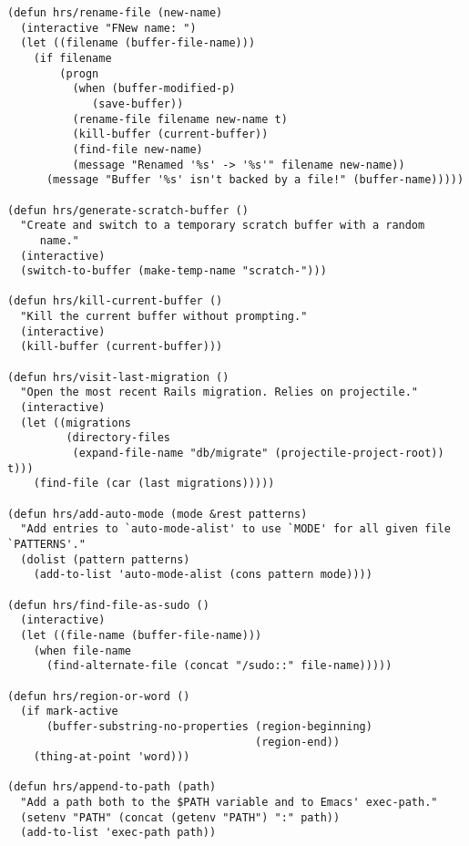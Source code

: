 \documentclass{article}
\begin{document}
\begin{verbatim}
(defun hrs/rename-file (new-name)
  (interactive "FNew name: ")
  (let ((filename (buffer-file-name)))
	(if filename
		(progn
		  (when (buffer-modified-p)
			 (save-buffer))
		  (rename-file filename new-name t)
		  (kill-buffer (current-buffer))
		  (find-file new-name)
		  (message "Renamed '%s' -> '%s'" filename new-name))
	  (message "Buffer '%s' isn't backed by a file!" (buffer-name)))))

(defun hrs/generate-scratch-buffer ()
  "Create and switch to a temporary scratch buffer with a random
	 name."
  (interactive)
  (switch-to-buffer (make-temp-name "scratch-")))

(defun hrs/kill-current-buffer ()
  "Kill the current buffer without prompting."
  (interactive)
  (kill-buffer (current-buffer)))

(defun hrs/visit-last-migration ()
  "Open the most recent Rails migration. Relies on projectile."
  (interactive)
  (let ((migrations
		 (directory-files
		  (expand-file-name "db/migrate" (projectile-project-root)) t)))
	(find-file (car (last migrations)))))

(defun hrs/add-auto-mode (mode &rest patterns)
  "Add entries to `auto-mode-alist' to use `MODE' for all given file `PATTERNS'."
  (dolist (pattern patterns)
	(add-to-list 'auto-mode-alist (cons pattern mode))))

(defun hrs/find-file-as-sudo ()
  (interactive)
  (let ((file-name (buffer-file-name)))
	(when file-name
	  (find-alternate-file (concat "/sudo::" file-name)))))

(defun hrs/region-or-word ()
  (if mark-active
	  (buffer-substring-no-properties (region-beginning)
									  (region-end))
	(thing-at-point 'word)))

(defun hrs/append-to-path (path)
  "Add a path both to the $PATH variable and to Emacs' exec-path."
  (setenv "PATH" (concat (getenv "PATH") ":" path))
  (add-to-list 'exec-path path))
\end{verbatim}
\end{document}

